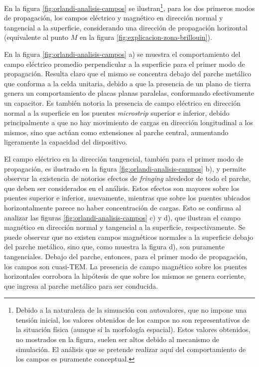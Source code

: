 En la figura \ref{fig:orlandi-analisis-campos} se ilustran\footnote{Debido a la naturaleza de la simuación con autovalores, que no impone una tensión inicial, los valores obtenidos de los campos no son representativos de la situación física (aunque sí la morfología espacial). Estos valores obtenidos, no mostrados en la figura, suelen ser altos debido al mecanismo de simulación. El análisis que se pretende realizar aquí del comportamiento de los campos es puramente conceptual.}, para los dos primeros modos de propagación, los campos eléctrico y magnético en dirección normal y tangencial a la superficie, considerando una dirección de propagación horizontal (equivalente al punto $M$ en la figura \ref{fig:explicacion-zona-brillouin}).

En la figura \ref{fig:orlandi-analisis-campos} a) se muestra el comportamiento del campo eléctrico promedio perpendicular a la superficie para el primer modo de propagación. Resulta claro que el mismo se concentra debajo del parche metálico que conforma a la celda unitaria, debido a que la presencia de un plano de tierra genera un comportamiento de placas planas paralelas, conformando efectivamente un capacitor. Es también notoria la presencia de campo eléctrico en dirección normal a la superficie en los puentes \textit{microstrip} superior e inferior, debido principalmente a que no hay movimiento de cargas en dirección longitudinal a los mismos, sino que actúan como extensiones al parche central, aumentando ligeramente la capacidad del dispositivo.

El campo eléctrico en la dirección tangencial, también para el primer modo de propagación, es ilustrado en la figura \ref{fig:orlandi-analisis-campos} b), y permite observar la existencia de notorios efectos de \textit{fringing} alrededor de todo el parche, que deben ser considerados en el análisis. Estos efectos son mayores sobre los puentes superior e inferior, nuevamente, mientras que sobre los puentes ubicados horizontalmente parece no haber concentración de cargas. Esto se confirma al analizar las figuras \ref{fig:orlandi-analisis-campos} c) y d), que ilustran el campo magnético en dirección normal y tangencial a la superficie, respectivamente. Se puede observar que no existen campos magnéticos normales a la superficie debajo del parche metálico, sino que, como muestra la figura d), son puramente tangenciales. Debajo del parche, entonces, para el primer modo de propagación, los campos son cuasi-TEM. La presencia de campo magnético sobre los puentes horizontales corrobora la hipótesis de que sobre los mismos se genera corriente, que ingresa al parche metálico para ser conducida.

